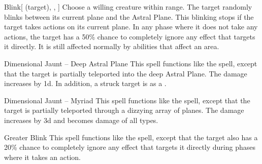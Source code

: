 \lowercase{\hypertarget{spell:Blink}{}}\label{spell:Blink}
\begin{ability}[\nth{4}]{\hypertarget{spell:Blink}{Blink}}[ (target), , ]
Choose a willing creature within \rngclose range.
The target randomly blinks between its current plane and the Astral Plane.
This blinking stops if the target takes actions on its current plane.
In any phase where it does not take any actions, the target has a 50\% chance to completely ignore any effect that targets it directly.
It is still affected normally by abilities that affect an area.
\end{ability}
\vspace{0.25em}



\lowercase{\hypertarget{spell:Dimensional Jaunt -- Deep Astral Plane}{}}\label{spell:Dimensional Jaunt -- Deep Astral Plane}
\begin{ability}[\nth{5}]{\hypertarget{spell:Dimensional Jaunt -- Deep Astral Plane}{Dimensional Jaunt -- Deep Astral Plane}}
This spell functions like the  spell, except that the target is partially teleported into the deep Astral Plane.
The damage increases by \plus1d.
In addition, a struck target is  as a .
\end{ability}
\vspace{0.25em}



\lowercase{\hypertarget{spell:Dimensional Jaunt -- Myriad}{}}\label{spell:Dimensional Jaunt -- Myriad}
\begin{ability}[\nth{6}]{\hypertarget{spell:Dimensional Jaunt -- Myriad}{Dimensional Jaunt -- Myriad}}
This spell functions like the  spell, except that the target is partially teleported through a dizzying array of planes.
The damage increases by \plus3d and becomes damage of all types.
\end{ability}
\vspace{0.25em}



\lowercase{\hypertarget{spell:Greater Blink}{}}\label{spell:Greater Blink}
\begin{ability}[\nth{7}]{\hypertarget{spell:Greater Blink}{Greater Blink}}
This spell functions like the  spell, except that the target also has a 20\% chance to completely ignore any effect that targets it directly during phases where it takes an action.
\end{ability}
\vspace{0.25em}




